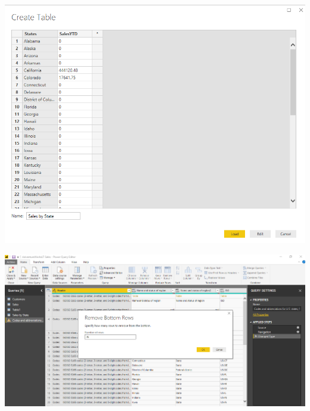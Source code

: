 	\begin{center}
	\includegraphics[width=15cm]{./Imagenes/EJER1T3(3)}
	\end{center}	
\newpage
	

	\begin{center}
	\includegraphics[width=15cm]{./Imagenes/EJER1T3(6)}
	\end{center}	
	

